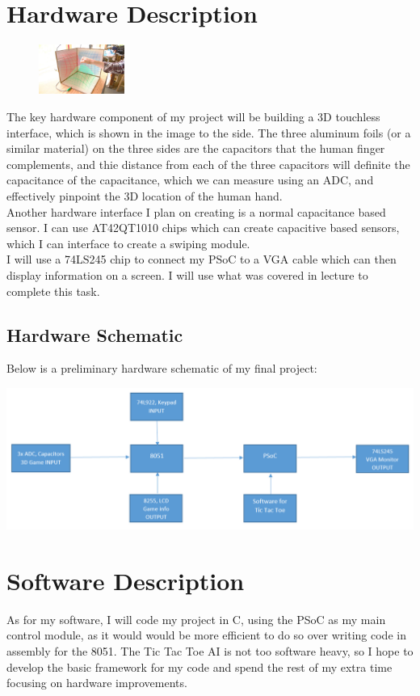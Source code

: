\documentclass[12pt,twoside]{article}
\begin{document}
\section{Hardware Description}
\begin{figure}
\centering
\includegraphics[width=0.25\textwidth]{3d_touch.jpg}
\end{figure}
The key hardware component of my project will be building a 3D touchless interface, which is shown in the image to the side. The three aluminum foils (or a similar material) on the three sides are the capacitors that the human finger complements, and thie distance from each of the three capacitors will definite the capacitance of the capacitance, which we can measure using an ADC, and effectively pinpoint the 3D location of the human hand. 
\\ Another hardware interface I plan on creating is a normal capacitance based sensor. I can use AT42QT1010 chips which can create capacitive based sensors, which I can interface to create a swiping module. 
\\ I will use a 74LS245 chip to connect my PSoC to a VGA cable which can then display information on a screen. I will use what was covered in lecture to complete this task. 


\subsection{Hardware Schematic}
Below is a preliminary hardware schematic of my final project:
\begin{center}\includegraphics[width = 150mm]{Hardware_final.png} \end{center}

\section{Software Description}
As for my software, I will code my project in C, using the PSoC as my main control module, as it would would be more efficient to do so over writing code in assembly for the 8051. The Tic Tac Toe AI is not too software heavy, so I hope to develop the basic framework for my code and spend the rest of my extra time focusing on hardware improvements. 
\end{document}
